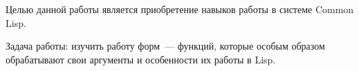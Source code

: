 
Целью данной работы является приобретение навыков работы в системе Common Lisp.

Задача работы: изучить работу форм~--- функций, которые особым образом обрабатывают свои аргументы и особенности их работы в Lisp.

\clearpage
